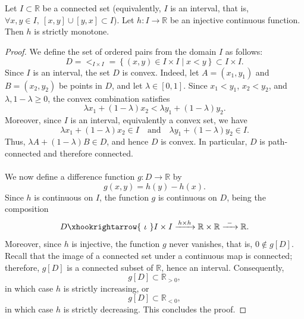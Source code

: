 \begin{solution}
    \\\\
    \begin{lemma}
        Let \( I \subset \mathbb{R} \) be a connected set (equivalently, \( I \) is an interval, that is, \( \forall x,y \in I,\ \left[ x,y \right] \cup \left[ y,x \right] \subset I \)). Let \( h : I \to \mathbb{R} \) be an injective continuous function. Then \( h \) is strictly monotone.
    \end{lemma}
    \begin{proof}
        We define the set of ordered pairs from the domain \( I \) as follows:
        \[
            D = <_{I\times I}=\left\{ \left(x,y\right) \in I \times I \mid x < y \right\} \subset I \times I .
        \]
        Since \( I \) is an interval, the set \( D \) is convex. Indeed, let \( A = \left(x_1,y_1\right) \) and \( B = \left(x_2,y_2\right) \) be points in \( D \), and let \( \lambda \in \left[ 0,1 \right] \). Since \( x_1 < y_1 \), \( x_2 < y_2 \), and \( \lambda, 1-\lambda \geq 0 \), the convex combination satisfies
        \[
            \lambda x_1 + \left(1-\lambda\right)x_2 < \lambda y_1 + \left(1-\lambda\right)y_2 .
        \]
        Moreover, since \( I \) is an interval, equivalently a convex set, we have
        \[
            \lambda x_1 + \left(1-\lambda\right)x_2 \in I \quad \text{and} \quad \lambda y_1 + \left(1-\lambda\right)y_2 \in I .
        \]
        Thus, \( \lambda A + \left(1-\lambda\right)B \in D \), and hence \( D \) is convex. In particular, \( D \) is path-connected and therefore connected.
        \\\\
        We now define a difference function \( g : D \to \mathbb{R} \) by
        \[
            g\left(x,y\right) = h\left(y\right) - h\left(x\right).
        \]
        Since \( h \) is continuous on \( I \), the function \( g \) is continuous on \( D \), being the composition
        \[
            D \xhookrightarrow{\ \iota\ } I \times I \xrightarrow{\, h \times h \,} \mathbb{R} \times \mathbb{R} \xrightarrow{\ -\ } \mathbb{R}.
        \]
        Moreover, since \( h \) is injective, the function \( g \) never vanishes, that is, \( 0 \notin g\left[ D \right] \). Recall that the image of a connected set under a continuous map is connected; therefore, \( g\left[ D \right] \) is a connected subset of \( \mathbb{R} \), hence an interval. Consequently,
        \[
            g\left[ D \right] \subset \mathbb{R}_{>0},
        \]
        in which case \( h \) is strictly increasing, or
        \[
            g\left[ D \right] \subset \mathbb{R}_{<0},
        \]
        in which case \( h \) is strictly decreasing. This concludes the proof.
    \end{proof}



\end{solution}

